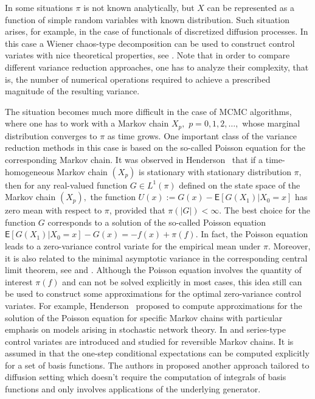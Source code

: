 \documentclass[aap,preprint]{imsart}
\begin{document}
In some situations \(\pi\) is not known analytically, but \(X\) can be represented as a function of  simple random variables with known distribution.
Such  situation arises, for example, in the case of functionals of  discretized diffusion processes. In this case a Wiener chaos-type decomposition can be used to construct control variates with nice theoretical properties, see \cite{belomestny2018stratified}.
Note that in order to compare different  variance reduction approaches, one has to analyze their complexity, that is, the number of numerical operations required to achieve a prescribed magnitude of the resulting variance.


The situation becomes much more difficult in the case of MCMC algorithms, where one  has to work with a
Markov chain \(X_p,\) \(p=0,1,2,\ldots,\) whose marginal distribution  converges  to \(\pi\) as time grows. One important class of the variance reduction methods in this case  is based on the so-called Poisson equation for the corresponding  Markov chain. It was observed in Henderson~\cite{henderson1997variance}  that if a time-homogeneous Markov chain \((X_p)\) is stationary with stationary distribution \(\pi,\) then for any real-valued function \(G \in L^1(\pi) \) defined on the state space of the Markov chain \((X_p),\)  the function \(U(x) := G(x)-\mathsf{E}[G(X_{1})|X_0 = x]\) has zero mean with respect to \(\pi\), provided that \(\pi(|G|) < \infty\).  The best choice for the function \(G\) corresponds to a solution of the so-called Poisson equation  \(\mathsf{E}[G(X_{1})|X_0 = x]-G(x)=-f(x)+\pi(f)\).  In fact,  the Poisson equation leads to a zero-variance control variate for the empirical mean under \(\pi.\) Moreover, it is also related to the minimal asymptotic variance in the corresponding central limit theorem, see \cite{duncan2016variance} and \cite{mira2013zero}.   Although the Poisson equation involves the quantity of interest \(\pi(f)\)  and can not be  solved explicitly in most cases, this idea still can be used to construct some  approximations for the optimal zero-variance control variates. For example,  Henderson~\cite{henderson1997variance} proposed to compute approximations for the solution of the Poisson equation for specific Markov chains with particular emphasis on models arising in stochastic network theory. In \cite{dellaportas2012control} and \cite{brosse2018diffusion}  series-type control variates are introduced and studied for reversible Markov chains. It is assumed in \cite{dellaportas2012control}  that the one-step conditional expectations  can be computed explicitly  for a set of basis functions. The authors in \cite{brosse2018diffusion} proposed another approach tailored to diffusion setting which doesn't require the computation of integrals of basis functions and only involves  applications of the underlying generator.
\end{document}
